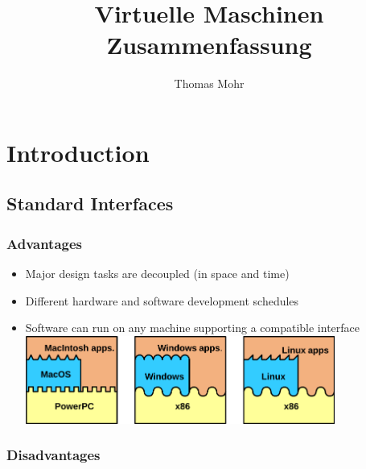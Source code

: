 \documentclass{scrartcl}
\title{Virtuelle Maschinen \\ Zusammenfassung}
\author{Thomas Mohr}
\date{}
\begin{document}
\maketitle

\section{Introduction}

\subsection{Standard Interfaces}

\subsubsection{Advantages}

\begin{itemize}
	\item Major design tasks are decoupled (in space and time)
	\item Different hardware and software development schedules
	\item Software can run on any machine supporting a compatible interface \\
	
	\includegraphics[width=0.8\textwidth]{figures/StandardInterfacesAdvantages.png}
\end{itemize}

\subsubsection{Disadvantages}
\end{document}
